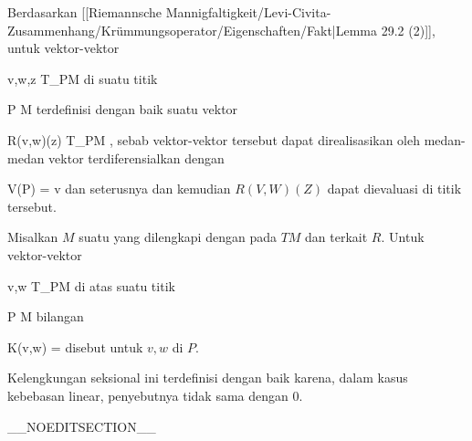 Berdasarkan
[[Riemannsche Mannigfaltigkeit/Levi-Civita-Zusammenhang/Krümmungsoperator/Eigenschaften/Fakt|Lemma 29.2 (2)]],
untuk vektor-vektor

\mavergleichskette
{\vergleichskette
{ v,w,z
}
{ \in }{ T_PM
}
{  }{
}
{    }{
}
{   }{
}
}
{}{}{}
di suatu titik

\mavergleichskette
{\vergleichskette
{ P
}
{ \in }{ M
}
{  }{
}
{    }{
}
{   }{
}
}
{}{}{}
terdefinisi dengan baik suatu vektor

\mavergleichskette
{\vergleichskette
{ R(v,w)(z)
}
{ \in }{ T_PM
}
{  }{
}
{    }{
}
{   }{
}
}
{}{}{,}
sebab vektor-vektor tersebut dapat direalisasikan oleh medan-medan vektor terdiferensialkan
 dengan

\mavergleichskette
{\vergleichskette
{ V(P)
}
{ = }{ v
}
{  }{
}
{    }{
}
{   }{
}
}
{}{}{}
dan seterusnya
 {} {}
dan kemudian $R(V,W)(Z)$ dapat dievaluasi di titik tersebut.


{}
{

Misalkan $M$ suatu
yang dilengkapi dengan
pada
$TM$ dan
terkait $R$. Untuk vektor-vektor

\mavergleichskette
{\vergleichskette
{ v,w
}
{ \in }{ T_PM
}
{  }{
}
{    }{
}
{   }{
}
}
{}{}{}
di atas suatu titik

\mavergleichskette
{\vergleichskette
{ P
}
{ \in }{ M
}
{  }{
}
{    }{
}
{   }{
}
}
{}{}{}
bilangan

\mavergleichskettedisp
{\vergleichskette
{ K(v,w)
}
{ =} { {  }
}
{ } {
}
{ } {
}
{ } {
}
}
{}{}{}
disebut
untuk $v,w$ di $P$.

}

Kelengkungan seksional ini terdefinisi dengan baik karena, dalam kasus kebebasan linear, penyebutnya tidak sama dengan $0$.

__NOEDITSECTION__

